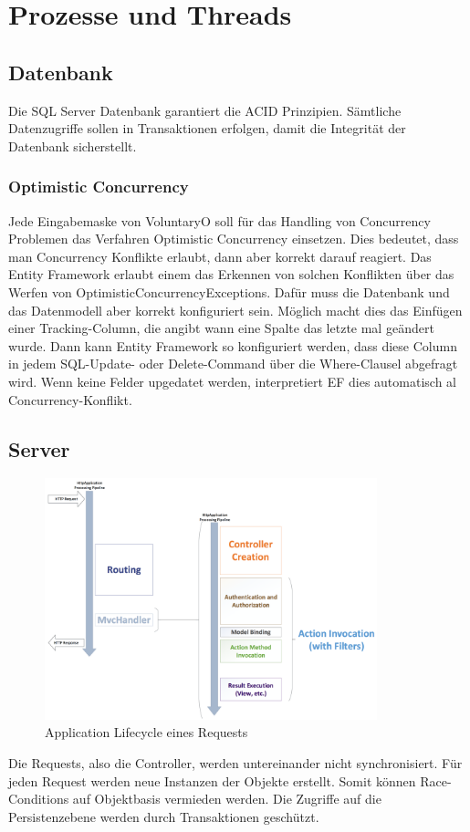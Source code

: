 \chapter{Prozesse und Threads}
	\section{Datenbank}
	Die SQL Server Datenbank garantiert die ACID Prinzipien. Sämtliche Datenzugriffe sollen in Transaktionen erfolgen, damit die Integrität der Datenbank sicherstellt.
	
	\subsection{Optimistic Concurrency}
	Jede Eingabemaske von VoluntaryO soll für das Handling von Concurrency Problemen das Verfahren Optimistic Concurrency einsetzen. Dies bedeutet, dass man Concurrency Konflikte erlaubt, dann aber korrekt darauf reagiert.
	Das Entity Framework erlaubt einem das Erkennen von solchen Konflikten über das Werfen von OptimisticConcurrencyExceptions. Dafür muss die Datenbank und das Datenmodell aber korrekt konfiguriert sein.
	Möglich macht dies das Einfügen einer Tracking-Column, die angibt wann eine Spalte das letzte mal geändert wurde. Dann kann Entity Framework so konfiguriert werden, dass diese Column in jedem SQL-Update- oder Delete-Command über die Where-Clausel abgefragt wird. Wenn keine Felder upgedatet werden, interpretiert EF dies automatisch al Concurrency-Konflikt.
	
	\section{Server}
	\begin{figure}
  		\vspace{-25pt}
	  	\begin{center}
    		\includegraphics[height=7cm]{content/architekturdokumentation/images/ApplicationLifecycle.png}
	  	\end{center}
  		\vspace{-20pt}
	 	\caption{Application Lifecycle eines Requests}
	\end{figure}
	Die Requests, also die Controller, werden untereinander nicht synchronisiert. Für jeden Request werden neue Instanzen der Objekte erstellt. Somit können Race-Conditions auf Objektbasis vermieden werden. Die Zugriffe auf die Persistenzebene werden durch Transaktionen geschützt.
	
	